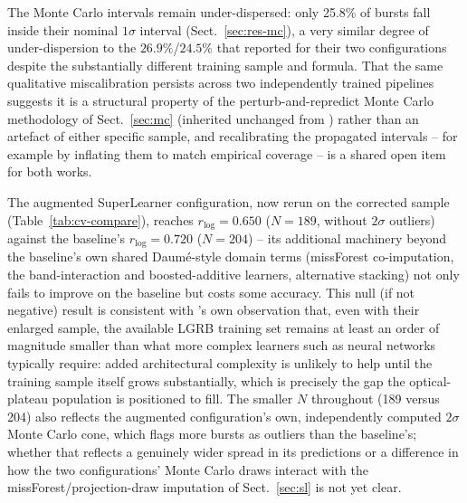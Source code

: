 \documentclass{aa}
\begin{document}
The Monte Carlo intervals remain under-dispersed: only 25.8\% of bursts fall
inside their nominal $1\sigma$ interval (Sect.~\ref{sec:res-mc}), a very
similar degree of under-dispersion to the $26.9\%$/$24.5\%$ that
\citet{narendra2025} reported for their two configurations despite the
substantially different training sample and formula. That the same qualitative
miscalibration persists across two independently trained pipelines suggests it
is a structural property of the perturb-and-repredict Monte Carlo methodology
of Sect.~\ref{sec:mc} (inherited unchanged from \citealt{narendra2025}) rather
than an artefact of either specific sample, and recalibrating the propagated
intervals -- for example by inflating them to match empirical coverage -- is a
shared open item for both works.

The augmented SuperLearner configuration, now rerun on the corrected sample
(Table~\ref{tab:cv-compare}), reaches $r_{\log}=0.650$ ($N=189$, without $2\sigma$
outliers) against the baseline's $r_{\log}=0.720$ ($N=204$) -- its additional
machinery beyond the baseline's own shared Daum\'e-style domain terms
(missForest co-imputation, the band-interaction and boosted-additive learners,
alternative stacking) not only fails to improve on the baseline but costs some
accuracy. This null (if not negative) result is consistent with
\citet{narendra2025}'s own observation that, even with their enlarged sample,
the available LGRB training set remains at least an order of magnitude
smaller than what more complex learners such as neural networks typically
require: added architectural complexity is unlikely to help until the
training sample itself grows substantially, which is precisely the gap the
optical-plateau population is positioned to fill. The smaller $N$ throughout
(189 versus 204) also reflects the augmented configuration's own, independently
computed $2\sigma$ Monte Carlo cone, which flags more bursts as outliers than the
baseline's; whether that reflects a genuinely wider spread in its predictions or
a difference in how the two configurations' Monte Carlo draws interact with the
missForest/projection-draw imputation of Sect.~\ref{sec:sl} is not yet clear.
\end{document}
